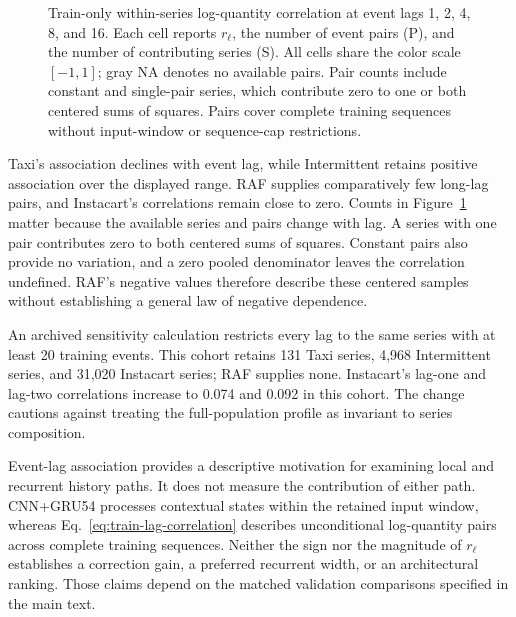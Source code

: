 \begin{figure}[t]
\caption{Train-only within-series log-quantity correlation at event lags 1, 2, 4, 8, and 16. Each cell reports $r_{\ell}$, the number of event pairs (P), and the number of contributing series (S). All cells share the color scale $[-1,1]$; gray NA denotes no available pairs. Pair counts include constant and single-pair series, which contribute zero to one or both centered sums of squares. Pairs cover complete training sequences without input-window or sequence-cap restrictions.}
\label{fig:train-lag-correlation}
\end{figure}

Taxi's association declines with event lag, while Intermittent retains
positive association over the displayed range. RAF supplies comparatively
few long-lag pairs, and Instacart's correlations remain close to zero.
Counts in Figure~\ref{fig:train-lag-correlation} matter because the available
series and pairs change with lag. A series with one pair contributes zero
to both centered sums of squares. Constant pairs also provide no variation,
and a zero pooled denominator leaves the correlation undefined.
RAF's negative values therefore describe these centered samples without
establishing a general law of negative dependence.

An archived sensitivity calculation restricts every lag to the same series
with at least 20 training events. This cohort retains 131 Taxi series,
4,968 Intermittent series, and 31,020 Instacart series; RAF supplies none.
Instacart's lag-one and lag-two correlations increase to 0.074 and 0.092
in this cohort. The change cautions against treating the full-population
profile as invariant to series composition.

Event-lag association provides a descriptive motivation for examining local
and recurrent history paths. It does not measure the contribution of either
path. CNN+GRU54 processes contextual states within the retained input window,
whereas Eq.~\eqref{eq:train-lag-correlation} describes unconditional
log-quantity pairs across complete training sequences. Neither the sign nor
the magnitude of $r_{\ell}$ establishes a correction gain, a preferred
recurrent width, or an architectural ranking. Those claims depend on the
matched validation comparisons specified in the main text.

